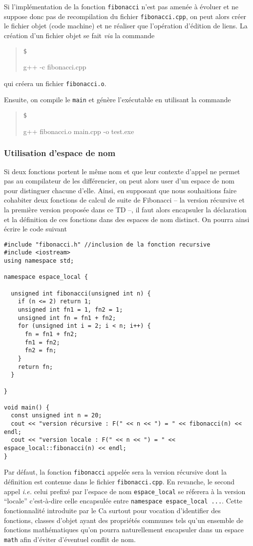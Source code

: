 \documentclass{book}
\newcommand{\inline}[1]{\texttt{#1}}
\newenvironment{prompt}{\begin{quote}\color{blue!75}\tt\$\,
}{\end{quote}}
\newcommand{\cpp}{\mbox{C\vspace{.5em}\protect\raisebox{.2ex}{\footnotesize++~}}}
\begin{document}
\begin{correction}
Si l'implémentation de la fonction \texttt{fibonacci} n'est pas amenée à évoluer et ne
suppose donc pas de recompilation du fichier \texttt{fibonacci.cpp}, on peut alors
créer le fichier objet (code machine) et ne réaliser que l'opération d'édition de liens. La création d'un fichier
objet se fait \emph{via} la commande
\begin{prompt}
g++ -c fibonacci.cpp
\end{prompt}
qui créera un fichier \texttt{fibonacci.o}.

Ensuite, on compile le \texttt{main} et génère l'exécutable en utilisant la commande
\begin{prompt}
g++ fibonacci.o main.cpp -o test.exe
\end{prompt}


\subsubsection{Utilisation d'espace de nom}
Si deux fonctions portent le même nom et que leur contexte d'appel ne permet pas
au compilateur de les différencier, on peut alors user d'un espace de nom pour
distinguer chacune d'elle. Ainsi, en supposant que nous souhaitions faire
cohabiter deux fonctions de calcul de suite de Fibonacci -- la version récursive
et la première version proposée dans ce TD --, il faut alors encapsuler la
déclaration et la définition de ces fonctions dans des espaces de nom
distinct. On pourra ainsi écrire le code suivant

\begin{verbatim}
#include "fibonacci.h" //inclusion de la fonction recursive
#include <iostream>
using namespace std;

namespace espace_local {

  unsigned int fibonacci(unsigned int n) {
    if (n <= 2) return 1;
    unsigned int fn1 = 1, fn2 = 1;
    unsigned int fn = fn1 + fn2;
    for (unsigned int i = 2; i < n; i++) {
      fn = fn1 + fn2;
      fn1 = fn2;
      fn2 = fn;
    }
    return fn;
  }

}

void main() {
  const unsigned int n = 20;
  cout << "version récursive : F(" << n << ") = " << fibonacci(n) << endl;
  cout << "version locale : F(" << n << ") = " << espace_local::fibonacci(n) << endl;
}
\end{verbatim}

Par défaut, la fonction \texttt{fibonacci} appelée sera la version récursive dont la
définition est contenue dans le fichier \texttt{fibonacci.cpp}. En revanche, le second
appel \emph{i.e.} celui prefixé par l'espace de nom \inline{espace_local} se réferera à la version
``locale'' c'est-à-dire celle encapsulée entre \inline{namespace espace_local {...}}. Cette
fonctionnalité introduite par le \cpp a surtout pour vocation d'identifier des
fonctions, classes d'objet ayant des propriétés communes tels qu'un ensemble de
fonctions mathématiques qu'on pourra naturellement encapsuler dans un espace
\texttt{math} afin d'éviter d'éventuel conflit de nom.
\end{correction}
\end{document}
